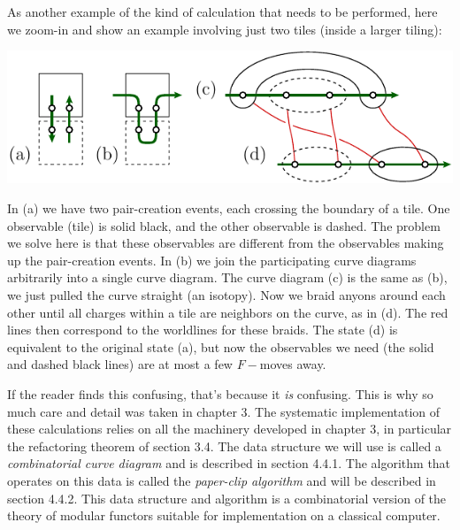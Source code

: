
As another example of the kind of calculation that needs to be performed,
here we zoom-in and show an example involving just two tiles (inside a larger tiling):
\begin{center}
\includegraphics[width=0.8\columnwidth]{pic-syndrome.pdf}
\end{center}
In (a) we have two pair-creation events, each crossing the boundary of a tile. 
One observable (tile) is solid black, and the other observable is dashed.
The problem we solve here is that 
these observables are different from the observables making up the
pair-creation events.
In (b) we join the participating curve 
diagrams arbitrarily into a single curve diagram.
The curve diagram (c) is the same as (b), we just
pulled the curve straight (an isotopy).
Now we braid anyons around each other until all charges within 
a tile are neighbors on the curve, as in (d).  
The red lines then correspond to the worldlines for these braids.
The state (d) is equivalent to the original
state (a), but now the observables we need (the solid and dashed
black lines) are at most a few $F-$moves away.

If the reader finds this confusing, that's because it \emph{is}
confusing. This is why so much care and detail was taken in chapter 3.
The systematic implementation of these calculations relies on all the
machinery developed in chapter 3, in particular the refactoring theorem of
section 3.4.
The data structure we will use is called a \emph{combinatorial curve diagram}
and is described in section 4.4.1.
The algorithm that operates on this data is called the 
\emph{paper-clip algorithm} and will be described in section 4.4.2.
This data structure and algorithm is a combinatorial version of the theory
of modular functors suitable for implementation on a classical computer.

